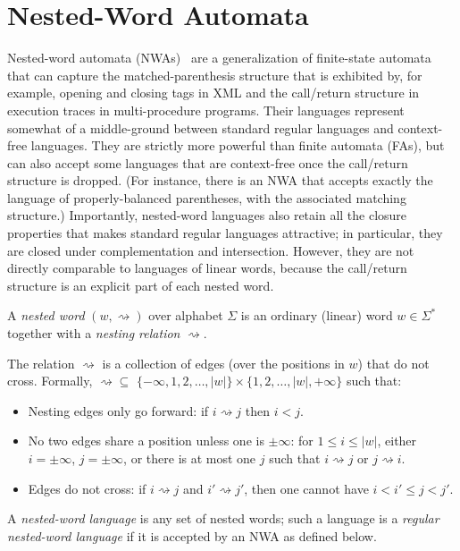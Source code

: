 \section{Nested-Word Automata}
\label{App:nwa-definition}

Nested-word automata (NWAs)~\cite{DLT:AM2006,JACM:AM2009} are a generalization
of finite-state automata that can capture the matched-parenthesis structure
that is exhibited by, for example, opening and closing tags in XML and the
call/return structure in execution traces in multi-procedure
programs. Their languages represent somewhat of a middle-ground between
standard regular languages and context-free languages. They are strictly more
powerful than finite automata (FAs), but can also accept some languages that
are context-free once the call/return structure is dropped. (For instance,
there is an NWA that
accepts exactly the language of properly-balanced parentheses, with the
associated matching structure.) Importantly, nested-word languages also retain all the closure
properties that makes standard regular languages attractive; in particular,
they are closed under complementation and intersection. However, they are not
directly comparable to languages of linear words, because the call/return
structure is an explicit part of each nested word.

\begin{definition}
  A \emph{nested word} $(w,\rightsquigarrow)$ over alphabet $\Sigma$ is an
  ordinary (linear) word $w \in \Sigma^*$ together with a
  \emph{nesting relation} $\rightsquigarrow$.

  The relation $\rightsquigarrow$ is a collection of edges (over the
  positions in $w$) that do not cross. Formally, $\rightsquigarrow \subseteq$
  $\{-\infty, 1, 2, \ldots, |w| \} \times \{1, 2, \ldots, |w|, +\infty\}$
  such that:
  \begin{itemize}
    \item
      Nesting edges only go forward: if $i \rightsquigarrow j$ then $i < j$.
    \item
      No two edges share a position unless one is $\pm\infty$: for $1
      \leq i \leq |w|$, either $i=\pm\infty$, $j=\pm\infty$, or
      there is at
      most one $j$ such that $i \rightsquigarrow j$ or $j \rightsquigarrow
      i$.
    \item
      Edges do not cross: if $i \rightsquigarrow j$ and $i' \rightsquigarrow
      j'$, then one cannot have $i < i' \leq j < j'$.
  \end{itemize}

  A \emph{nested-word language} is any set of nested words; such a language
  is a \emph{regular nested-word language} if it is accepted by an NWA as
  defined below.
\end{definition}

